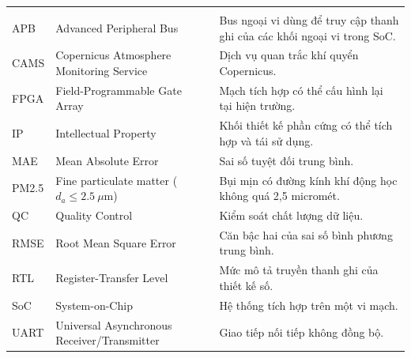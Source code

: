 \documentclass[a4paper,oneside,openany]{extreport}
\begin{document}
\hypersetup{pageanchor=false}


\pagestyle{empty}
\uittableofcontents
\uitlistoffigures
\uitlistoftables

\clearpage
{}
\begingroup
\fontsize{12pt}{14pt}\selectfont
\setlength{\tabcolsep}{5.5pt}
\setlength{\LTleft}{0pt plus 1fil}
\setlength{\LTright}{0pt plus 1fil}
\begin{longtable}{|C{0.14\textwidth}|C{0.33\textwidth}|C{0.41\textwidth}|}
\hline
{} &  &  \\
\hline
\endfirsthead
\hline
{} &  &  \\
\hline
\endhead
APB & Advanced Peripheral Bus & Bus ngoại vi dùng để truy cập thanh ghi của các khối ngoại vi trong SoC. \\
\hline
CAMS & Copernicus Atmosphere Monitoring Service & Dịch vụ quan trắc khí quyển Copernicus. \\
\hline
FPGA & Field-Programmable Gate Array & Mạch tích hợp có thể cấu hình lại tại hiện trường. \\
\hline
IP & Intellectual Property & Khối thiết kế phần cứng có thể tích hợp và tái sử dụng. \\
\hline
MAE & Mean Absolute Error & Sai số tuyệt đối trung bình. \\
\hline
PM2.5 & Fine particulate matter ($d_a \leq 2.5~\mu\mathrm{m}$) & Bụi mịn có đường kính khí động học không quá 2,5 micromét. \\
\hline
QC & Quality Control & Kiểm soát chất lượng dữ liệu. \\
\hline
RMSE & Root Mean Square Error & Căn bậc hai của sai số bình phương trung bình. \\
\hline
RTL & Register-Transfer Level & Mức mô tả truyền thanh ghi của thiết kế số. \\
\hline
SoC & System-on-Chip & Hệ thống tích hợp trên một vi mạch. \\
\hline
UART & Universal Asynchronous Receiver/Transmitter & Giao tiếp nối tiếp không đồng bộ. \\
\hline
\end{longtable}
\endgroup

\clearpage
{}
\setcounter{page}{1}
\hypersetup{pageanchor=true}
\pagestyle{reportplain}
\end{document}
